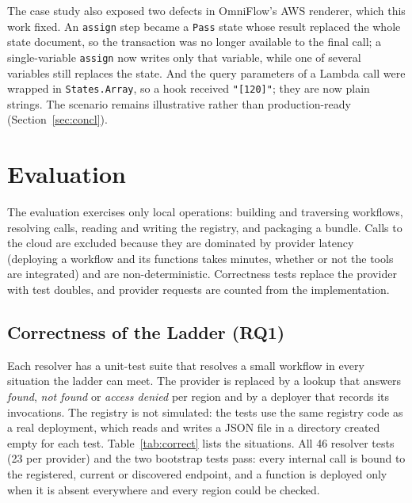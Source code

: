 \documentclass[conference]{IEEEtran}
\begin{document}
The case study also exposed two defects in OmniFlow's AWS renderer, which this work fixed. An
\texttt{assign} step became a \texttt{Pass} state whose result replaced the whole state document,
so the transaction was no longer available to the final call; a single-variable \texttt{assign} now
writes only that variable, while one of several variables still replaces the state. And the query
parameters of a Lambda call were wrapped in \texttt{States.Array}, so a hook received
\texttt{"[120]"}; they are now plain strings. The scenario remains illustrative rather than
production-ready (Section~\ref{sec:concl}).

\section{Evaluation}
\label{sec:eval}

The evaluation exercises only local operations: building and traversing workflows, resolving calls,
reading and writing the registry, and packaging a bundle. Calls to the cloud are excluded because
they are dominated by provider latency (deploying a workflow and its functions takes minutes,
whether or not the tools are integrated) and are non-deterministic. Correctness tests replace the
provider with test doubles, and provider requests are counted from the implementation.

\subsection{Correctness of the Ladder (RQ1)}
Each resolver has a unit-test suite that resolves a small workflow in every situation the ladder
can meet. The provider is replaced by a lookup that answers \emph{found}, \emph{not found} or
\emph{access denied} per region and by a deployer that records its invocations. The registry is not simulated: the
tests use the same registry code as a real deployment, which reads and writes a JSON file in a
directory created empty for each test. Table~\ref{tab:correct} lists the situations. All 46 resolver tests (23 per provider)
and the two bootstrap tests pass: every internal call is bound to the registered, current or
discovered endpoint, and a function is deployed only when it is absent everywhere and every region
could be checked.
\end{document}

